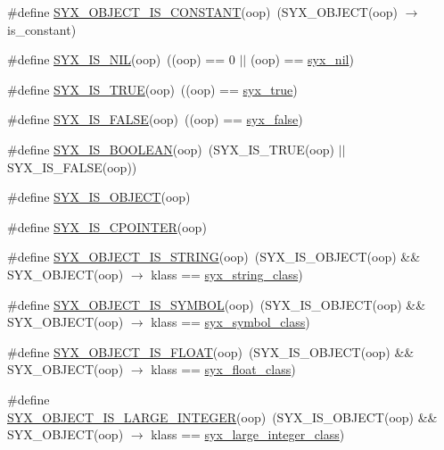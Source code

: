 \begin{CompactItemize}
\item 
\#define \hyperlink{syx-object_8h_e63d2bc397e9f66e55b915520658bb95}{SYX\_\-OBJECT\_\-IS\_\-CONSTANT}(oop)~(SYX\_\-OBJECT(oop) $\rightarrow$ is\_\-constant)
\item 
\#define \hyperlink{syx-object_8h_a0618a2af4e0706b7080c6946ae43ee3}{SYX\_\-IS\_\-NIL}(oop)~((oop) == 0 $|$$|$ (oop) == \hyperlink{syx-object_8h_099047c2766cf0dea30c046d58f6f64f}{syx\_\-nil})
\item 
\#define \hyperlink{syx-object_8h_d906bc6552333687f0f006132d38c07b}{SYX\_\-IS\_\-TRUE}(oop)~((oop) == \hyperlink{syx-object_8h_ac2fe13e9bd66770ef58d98f2be8629d}{syx\_\-true})
\item 
\#define \hyperlink{syx-object_8h_bc047647f8b39be70f2e2a2e205a9923}{SYX\_\-IS\_\-FALSE}(oop)~((oop) == \hyperlink{syx-object_8h_d3170f4cecf092ffa04e6f55351d12d0}{syx\_\-false})
\item 
\#define \hyperlink{syx-object_8h_4748238146463f5f05f8c11ff422b6d3}{SYX\_\-IS\_\-BOOLEAN}(oop)~(SYX\_\-IS\_\-TRUE(oop) $|$$|$ SYX\_\-IS\_\-FALSE(oop))
\item 
\#define \hyperlink{syx-object_8h_0904e42bcfe1d2cb2522253294562c77}{SYX\_\-IS\_\-OBJECT}(oop)
\item 
\#define \hyperlink{syx-object_8h_2cf93a0e501e2f8742d71709cb796fef}{SYX\_\-IS\_\-CPOINTER}(oop)
\item 
\#define \hyperlink{syx-object_8h_d204bd0bc6eafc156499e29e5c33730d}{SYX\_\-OBJECT\_\-IS\_\-STRING}(oop)~(SYX\_\-IS\_\-OBJECT(oop) \&\& SYX\_\-OBJECT(oop) $\rightarrow$ klass == \hyperlink{syx-object_8h_e1c7125650c6406bf4809ce106de8b36}{syx\_\-string\_\-class})
\item 
\#define \hyperlink{syx-object_8h_d411630830fe2cd1696bce40096b181f}{SYX\_\-OBJECT\_\-IS\_\-SYMBOL}(oop)~(SYX\_\-IS\_\-OBJECT(oop) \&\& SYX\_\-OBJECT(oop) $\rightarrow$ klass == \hyperlink{syx-object_8h_e10f18ec5e45484612b5a7fe6b96518d}{syx\_\-symbol\_\-class})
\item 
\#define \hyperlink{syx-object_8h_ed76a2c170663e7169be0e737e8069a8}{SYX\_\-OBJECT\_\-IS\_\-FLOAT}(oop)~(SYX\_\-IS\_\-OBJECT(oop) \&\& SYX\_\-OBJECT(oop) $\rightarrow$ klass == \hyperlink{syx-object_8h_a99406e5776ba4d5b8584c9dba551379}{syx\_\-float\_\-class})
\item 
\#define \hyperlink{syx-object_8h_93ab1383db7e0cafc185af9d9ef1e591}{SYX\_\-OBJECT\_\-IS\_\-LARGE\_\-INTEGER}(oop)~(SYX\_\-IS\_\-OBJECT(oop) \&\& SYX\_\-OBJECT(oop) $\rightarrow$ klass == \hyperlink{syx-object_8h_56d7e3f1e550bc346b3fd6cbcb31c6a2}{syx\_\-large\_\-integer\_\-class})

\end{CompactItemize}
